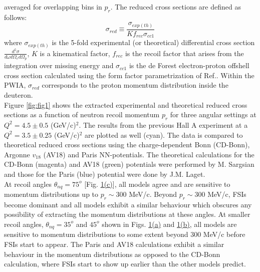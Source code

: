 \twocolumngrid
\noindent averaged for overlapping bins in $p_{r}$. The reduced cross sections are defined as follows:
\begin{equation}
\sigma_{red} \equiv \frac{\sigma_{exp(th)}}{Kf_{rec}\sigma_{cc1}}
\label{eq:1}
\end{equation}
where $\sigma_{exp(th)}$ is the 5-fold experimental (or theoretical) differential cross section $\frac{d^{5}\sigma}{d\omega d\Omega_{e} d\Omega_{p}}$, $K$ is a kinematical factor, $f_{rec}$ is the recoil factor that arises from the
integration over missing energy and $\sigma_{cc1}$ is the de Forest\cite{DEFOREST1983} electron-proton offshell cross section calculated using the form factor parametrization of Ref.\cite{PhysRevC.69.022201}.
Within the PWIA, $\sigma_{red}$ corresponds to the proton momentum distribution inside the deuteron. \\
\indent Figure \ref{fig:fig1} shows the extracted experimental and theoretical reduced cross sections as a function of neutron recoil momentum $p_{r}$ for three angular settings at $Q^{2}=4.5\pm0.5$
(GeV/c)$^{2}$. The results from the previous Hall A experiment\cite{PhysRevLett.107.262501} at a $Q^{2}=3.5\pm0.25$ (GeV/c)$^{2}$ are plotted as well (cyan). The data is compared to theoretical reduced
cross sections using the charge-dependent Bonn (CD-Bonn)\cite{PhysRevC.63.024001}, Argonne $v_{18}$ (AV18)\cite{PhysRevC.51.38} and Paris\cite{PhysRevC.21.861} NN-potentials. The theoretical calculations
for the CD-Bonn (magenta) and AV18 (green) potentials were performed by M. Sargsian\cite{PhysRevC.82.014612} and those for the Paris (blue) potential were done by J.M. Laget\cite{LAGET2005}. \\
\indent At recoil angles $\theta_{nq}=75^{o}$ [Fig. \hyperref[fig:fig1]{1(c)}], all models agree and are sensitive to momentum distributions up to $p_{r}\sim$300 MeV/c. Beyond $p_{r}\sim$300 MeV/c, FSIs become
dominant and all models exhibit a similar behaviour which obscures any possibility of extracting the momentum distributions at these angles. At smaller recoil angles, $\theta_{nq}=35^{o}$ and $45^{o}$ shown in
Figs. \hyperref[fig:fig1]{1(a)} and \hyperref[fig:fig1]{1(b)}, all models are sensitive to momentum distributions to some extent beyond $300$ MeV/c before FSIs start to appear. The Paris and AV18 calculations
exhibit a similar behaviour in the momentum distributions as opposed to the CD-Bonn calculation, where FSIs start to show up earlier than the other models predict. 




